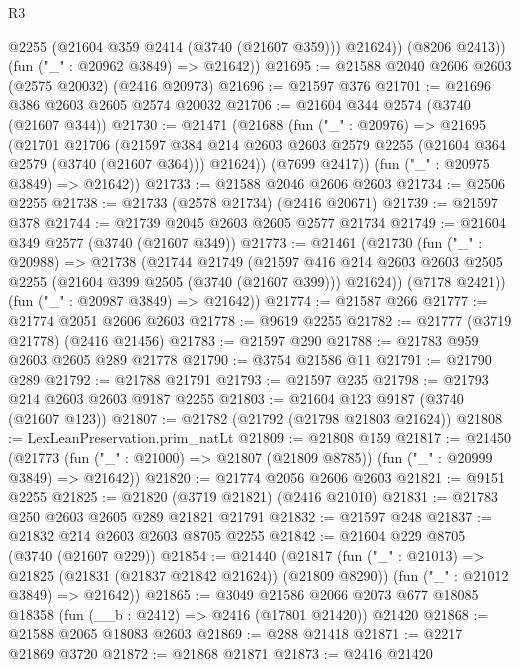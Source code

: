 \begin{lexlean}{R3}
\begin{coremodule}
            @2255
            (@21604 @359 @2414 (@3740 (@21607 @359)))
            @21624))
        (@8206 @2413))
      (fun ("_" : @20962 @3849) => @21642))
@21695 := @21588 @2040 @2606 @2603 (@2575 @20032) (@2416 @20973)
@21696 := @21597 @376
@21701 := @21696 @386 @2603 @2605 @2574 @20032
@21706 := @21604 @344 @2574 (@3740 (@21607 @344))
@21730 := @21471
    (@21688
      (fun ("_" : @20976) =>
      @21695
        (@21701
          @21706
          (@21597
            @384
            @214
            @2603
            @2603
            @2579
            @2255
            (@21604 @364 @2579 (@3740 (@21607 @364)))
            @21624))
        (@7699 @2417))
      (fun ("_" : @20975 @3849) => @21642))
@21733 := @21588 @2046 @2606 @2603
@21734 := @2506 @2255
@21738 := @21733 (@2578 @21734) (@2416 @20671)
@21739 := @21597 @378
@21744 := @21739 @2045 @2603 @2605 @2577 @21734
@21749 := @21604 @349 @2577 (@3740 (@21607 @349))
@21773 := @21461
    (@21730
      (fun ("_" : @20988) =>
      @21738
        (@21744
          @21749
          (@21597
            @416
            @214
            @2603
            @2603
            @2505
            @2255
            (@21604 @399 @2505 (@3740 (@21607 @399)))
            @21624))
        (@7178 @2421))
      (fun ("_" : @20987 @3849) => @21642))
@21774 := @21587 @266
@21777 := @21774 @2051 @2606 @2603
@21778 := @9619 @2255
@21782 := @21777 (@3719 @21778) (@2416 @21456)
@21783 := @21597 @290
@21788 := @21783 @959 @2603 @2605 @289 @21778
@21790 := @3754 @21586 @11
@21791 := @21790 @289
@21792 := @21788 @21791
@21793 := @21597 @235
@21798 := @21793 @214 @2603 @2603 @9187 @2255
@21803 := @21604 @123 @9187 (@3740 (@21607 @123))
@21807 := @21782 (@21792 (@21798 @21803 @21624))
@21808 := LexLeanPreservation.prim_natLt
@21809 := @21808 @159
@21817 := @21450
    (@21773 (fun ("_" : @21000) => @21807 (@21809 @8785)) (fun ("_" : @20999 @3849) => @21642))
@21820 := @21774 @2056 @2606 @2603
@21821 := @9151 @2255
@21825 := @21820 (@3719 @21821) (@2416 @21010)
@21831 := @21783 @250 @2603 @2605 @289 @21821 @21791
@21832 := @21597 @248
@21837 := @21832 @214 @2603 @2603 @8705 @2255
@21842 := @21604 @229 @8705 (@3740 (@21607 @229))
@21854 := @21440
    (@21817
      (fun ("_" : @21013) => @21825 (@21831 (@21837 @21842 @21624)) (@21809 @8290))
      (fun ("_" : @21012 @3849) => @21642))
@21865 := @3049
    @21586
    @2066
    @2073
    @677
    @18085
    @18358
    (fun (__b : @2412) => @2416 (@17801 @21420))
    @21420
@21868 := @21588 @2065 @18083 @2603
@21869 := @288 @21418
@21871 := @2217 @21869 @3720
@21872 := @21868 @21871
@21873 := @2416 @21420

\end{coremodule}
\end{lexlean}

